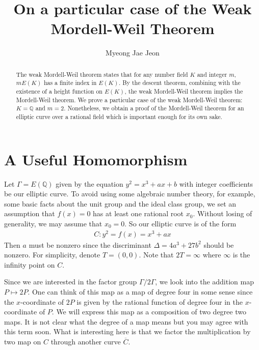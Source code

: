 \documentclass[11pt]{article}
\title{On a particular case of the Weak Mordell-Weil Theorem}
\author{Myeong Jae Jeon}
\date{}
\newcommand{\<}{\langle}
\renewcommand{\>}{\rangle}
\numberwithin{equation}{section}
\theoremstyle{plain}
\theoremstyle{definition}
\begin{document}
\maketitle

\begin{abstract}
 The weak Mordell-Weil theorem states that for any number field \(K \) and integer \(m\), \(mE(K)\) has a finite index in \(E(K)\). By the descent theorem, combining with the existence of a height function on \(E(K)\), the weak Mordell-Weil theorem implies the Mordell-Weil theorem. We prove a particular case of the weak Mordell-Weil theorem: \(K=\mathbb{Q}\) and \(m=2\). Nonetheless, we obtain a proof of the Mordell-Weil theorem for an elliptic curve over a rational field which is important enough for its own sake.
\end{abstract}

\section{A Useful Homomorphism} \label{section-H}

    Let \( \Gamma = E(\mathbb{Q})\) given by the equation \(y^2 = x^3 + ax + b\) with integer coefficients be our elliptic curve. To avoid using some algebraic number theory, for example, some basic facts about the unit group and the ideal class group, we set an assumption that \(f(x) = 0 \) has at least one rational root \(x_0\). Without losing of generality, we may assume that \(x_0 = 0\). So our elliptic curve is of the form
        \begin{align*}
                C: y^2 = f(x) = x^3 + ax         
        \end{align*}
    Then \(a\) must be nonzero since the discriminant \( \Delta = 4a^3 + 27b^2 \) should be nonzero. For simplicity, denote \( T = (0,0) \). Note that \(2T = \infty \) where \( \infty \) is the infinity point on \( C \). 
    
    Since we are interested in the factor group \( \Gamma / 2 \Gamma\), we look into the addition map \( P \mapsto 2P \). One can think of this map as a map of degree four in some sense since the \(x\)-coordinate of \(2P\) is given by the rational function of degree four in the \(x\)-coordinate of \(P\). We will express this map as a composition of two degree two maps. It is not clear what the degree of a map means but you may agree with this term soon. What is interesting here is that we factor the multiplication by two map on \( C \) through another curve \( \overline{C} \).
    
\end{document}
